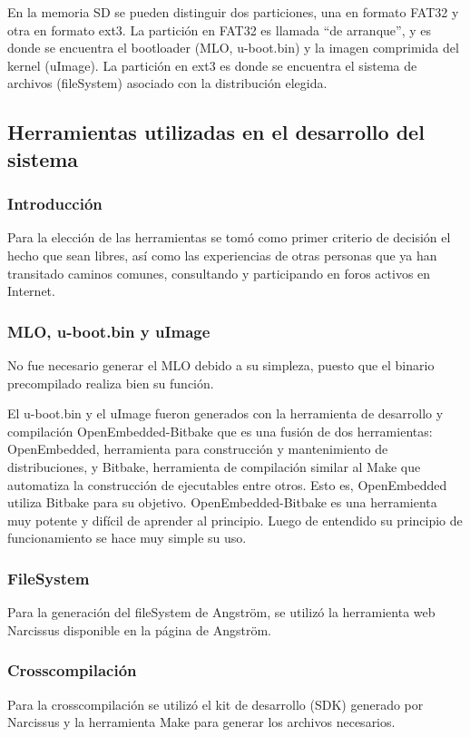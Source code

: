 \documentclass[%
        final,
        notitlepage,
        narroweqnarray,
        inline,
        ]{ieee}
\begin{document}
En la memoria SD se pueden distinguir dos particiones, una en formato FAT32 y otra
en formato ext3. La partición en FAT32 es llamada “de arranque”, y es donde se encuentra 
el bootloader (MLO, u-boot.bin) y la imagen comprimida del kernel (uImage). 
La partición en ext3 es donde se encuentra el sistema de archivos (fileSystem) asociado con la distribución elegida.


\subsection{Herramientas utilizadas en el desarrollo del sistema}

\subsubsection{Introducción}
Para la elección de las herramientas se tomó como primer criterio de decisión el hecho que sean libres, así como las experiencias de otras personas que ya han transitado caminos comunes, consultando y participando en foros activos en Internet.


\subsubsection{MLO, u-boot.bin y uImage}
No fue necesario generar el MLO debido a su simpleza, puesto que el binario precompilado realiza bien su función.

El u-boot.bin y el uImage fueron generados con la herramienta de desarrollo y compilación OpenEmbedded-Bitbake \cite{OE-Bb} que es una fusión de dos herramientas: OpenEmbedded, herramienta para construcción y mantenimiento de distribuciones, y Bitbake, herramienta de compilación similar al Make que automatiza la construcción de ejecutables entre otros. Esto es, OpenEmbedded utiliza Bitbake para su objetivo. OpenEmbedded-Bitbake es una herramienta muy potente y difícil de aprender al principio. Luego de entendido su principio de funcionamiento se hace muy simple su uso.


\subsubsection{FileSystem}
Para la generación del fileSystem de Angström, se utilizó la herramienta web Narcissus disponible en la página de Angström.


\subsubsection{Crosscompilación}
Para la crosscompilación se utilizó el kit de desarrollo (SDK) generado por Narcissus y la herramienta Make para generar los archivos necesarios.
\end{document}
